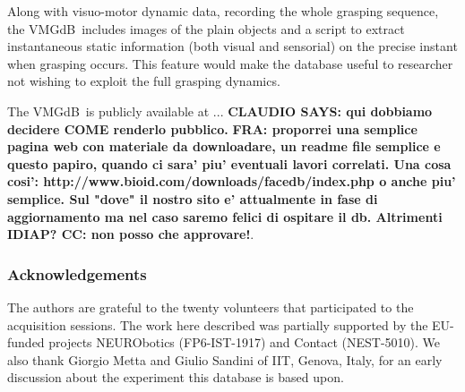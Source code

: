 \documentclass{article}
\newcommand{\db}{\textsf{VMGdB}}
\begin{document}
Along with visuo-motor dynamic data, recording the whole grasping sequence, the
\db\ includes images of the plain objects and a script to extract instantaneous static
information (both visual and sensorial) on the precise instant when grasping occurs.
This feature would make the database useful to researcher not wishing to exploit the
full grasping dynamics. 

The \db\ is publicly available at ... \textbf{CLAUDIO SAYS: qui dobbiamo decidere COME renderlo pubblico.}
{\bf FRA: proporrei una semplice pagina web con materiale da downloadare, un readme file semplice e questo papiro, quando ci sara' piu' eventuali lavori correlati.
Una cosa cosi': http://www.bioid.com/downloads/facedb/index.php o anche piu' semplice. Sul "dove" il nostro sito e' attualmente in fase di aggiornamento ma nel caso saremo felici di ospitare il db. Altrimenti IDIAP?
CC: non posso che approvare!}.

\subsubsection*{Acknowledgements}

The authors are grateful to the twenty volunteers that participated to the acquisition sessions.
The work here described was partially supported by the EU-funded projects NEURObotics (FP6-IST-1917)
and Contact (NEST-5010). We also thank Giorgio Metta and Giulio Sandini of IIT, Genova, Italy,
for an early discussion about the experiment this database is based upon.



\end{document}
